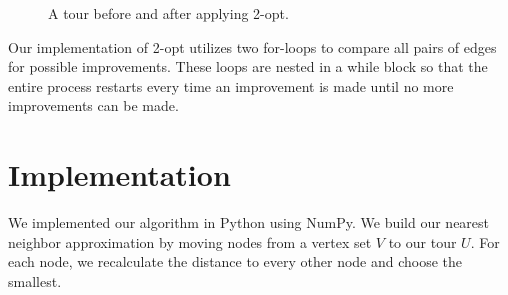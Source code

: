 \documentclass[12pt,letterpaper]{article}
\begin{document}
\begin{figure}[H]
  \centering
  \caption{A tour before and after applying 2-opt.}
  \begin{minipage}{.2\textwidth}
  \end{minipage}
  \hspace{1.5in}
  \begin{minipage}{.2\textwidth}
  \end{minipage}
\end{figure}

Our implementation of 2-opt utilizes two for-loops to compare all pairs of edges
for possible improvements. These loops are nested in a while block so that the
entire process restarts every time an improvement is made until no more
improvements can be made.

\section{Implementation}

We implemented our algorithm in Python using NumPy. We build our nearest
neighbor approximation by moving nodes from a vertex set $V$ to our tour $U$.
For each node, we recalculate the distance to every other node and choose the
smallest.
\end{document}
